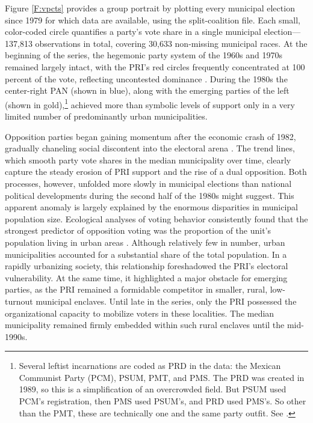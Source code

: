 \documentclass[letter,12pt]{article}
\begin{document}
Figure \ref{F:vpcts} provides a group portrait by plotting every municipal election since 1979 for which data are available, using the split-coalition file. Each small, color-coded circle quantifies a party's vote share in a single municipal election---137,813 observations in total, covering 30,633 non-missing municipal races. At the beginning of the series, the hegemonic party system of the 1960s and 1970s remained largely intact, with the PRI's red circles frequently concentrated at 100 percent of the vote, reflecting uncontested dominance \citep{segovia.els1979}. During the 1980s the center-right PAN (shown in blue), along with the emerging parties of the left (shown in gold),\footnote{Several leftist incarnations are coded as PRD in the data: the Mexican Communist Party (PCM), PSUM, PMT, and PMS. The PRD was created in 1989, so this is a simplification of an overcrowded field. But PSUM used PCM's registration, then PMS used PSUM's, and PRD used PMS's. So other than the PMT, these are technically one and the same party outfit. See \citet{molinar.1991a}.} achieved more than symbolic levels of support only in a very limited number of predominantly urban municipalities.

Opposition parties began gaining momentum after the economic crash of 1982, gradually chaneling social discontent into the electoral arena \citep{molinar.1991a, klesner.Alignment.1993, hiskey.canache.2005, gomezTagle.Estadisticas1990, segovia.dientes-sierra1983}. The trend lines, which smooth party vote shares in the median municipality over time, clearly capture the steady erosion of PRI support and the rise of a dual opposition. Both processes, however, unfolded more slowly in municipal elections than national political developments during the second half of the 1980s might suggest. This apparent anomaly is largely explained by the enormous disparities in municipal population size. Ecological analyses of voting behavior consistently found that the strongest predictor of opposition voting was the proportion of the unit's population living in urban areas \citep{ames.1970, lehr.1985, magar.1994, walton.sween-1973, pacheco.VotoUrb.1997}. Although relatively few in number, urban municipalities accounted for a substantial share of the total population. In a rapidly urbanizing society, this relationship foreshadowed the PRI's electoral vulnerability. At the same time, it highlighted a major obstacle for emerging parties, as the PRI remained a formidable competitor in smaller, rural, low-turnout municipal enclaves. Until late in the series, only the PRI possessed the organizational capacity to mobilize voters in these localities. The median municipality remained firmly embedded within such rural enclaves until the mid-1990s.
\end{document}
